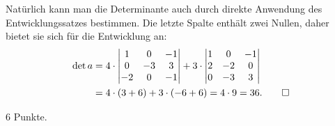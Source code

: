 \begin{loesung}
Natürlich kann man die Determinante auch durch direkte Anwendung des
Entwicklungssatzes bestimmen.
Die letzte Spalte enthält zwei Nullen, daher bietet sie sich für die
Entwicklung an:
\begin{align*}
\det a
&=
4\cdot
\left|\begin{matrix}
 1& 0&-1\\
 0&-3& 3\\
-2& 0&-1
\end{matrix}\right|
+3\cdot
\left|\begin{matrix}
 1& 0&-1\\
 2&-2& 0\\
 0&-3& 3
\end{matrix}\right|
\\
&=
4\cdot(3+6)+3\cdot(-6+6)=4\cdot 9=36.
\qedhere
\end{align*}
\end{loesung}

\begin{bewertung}
6 Punkte.
\end{bewertung}

